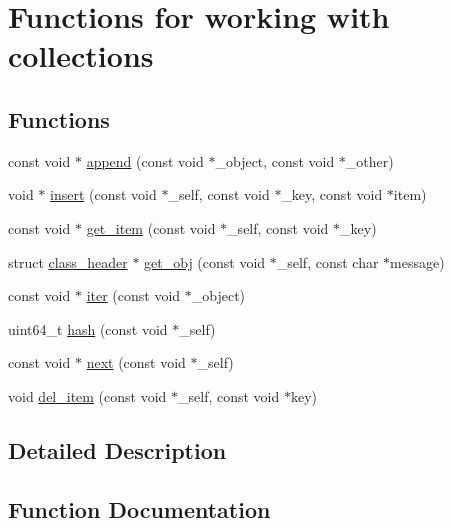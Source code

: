 \hypertarget{group__collection}{}\section{Functions for working with collections}
\label{group__collection}
\subsection*{Functions}
\begin{DoxyCompactItemize}
\item 
const void $\ast$ \mbox{\hyperlink{group__collection_ga2bd4216bcf1d5810032394f57fbf5c2f}{append}} (const void $\ast$\+\_\+object, const void $\ast$\+\_\+other)
\item 
void $\ast$ \mbox{\hyperlink{group__collection_gaa1b700b0fbad0b56b81291260569d8b2}{insert}} (const void $\ast$\+\_\+self, const void $\ast$\+\_\+key, const void $\ast$item)
\item 
const void $\ast$ \mbox{\hyperlink{group__collection_gaa467fc1e6a3036f13ea20b36a6e672a1}{get\+\_\+item}} (const void $\ast$\+\_\+self, const void $\ast$\+\_\+key)
\item 
struct \mbox{\hyperlink{structclass__header}{class\+\_\+header}} $\ast$ \mbox{\hyperlink{group__collection_gaaad95663edf19fd4b734bd9977976169}{get\+\_\+obj}} (const void $\ast$\+\_\+self, const char $\ast$message)
\item 
const void $\ast$ \mbox{\hyperlink{group__collection_ga0cb67414335937707c9b92809a10895b}{iter}} (const void $\ast$\+\_\+object)
\item 
uint64\+\_\+t \mbox{\hyperlink{group__collection_gae0b3682e6ff5038e94c9e551bdd0d489}{hash}} (const void $\ast$\+\_\+self)
\item 
const void $\ast$ \mbox{\hyperlink{group__collection_gaecc46e74b03a83ca8a8023cc7264489c}{next}} (const void $\ast$\+\_\+self)
\item 
void \mbox{\hyperlink{group__collection_ga8b99290b943601321e5bf291daecaae3}{del\+\_\+item}} (const void $\ast$\+\_\+self, const void $\ast$key)
\end{DoxyCompactItemize}


\subsection{Detailed Description}


\subsection{Function Documentation}
\mbox{\label{group__collection_ga2bd4216bcf1d5810032394f57fbf5c2f}} 
